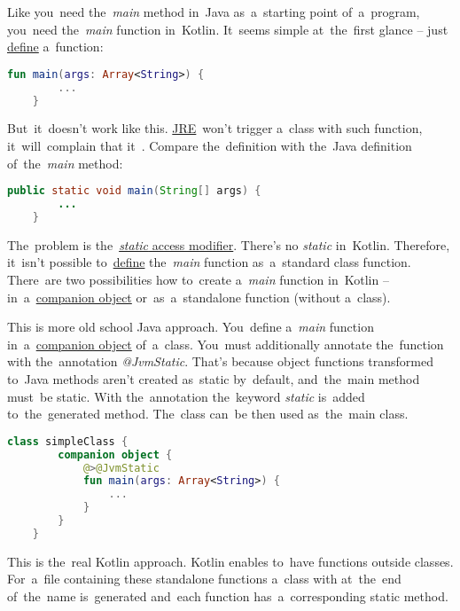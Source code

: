 Like you~need the~\textit{main} method in~Java as~a~starting point of~a~program, you~need the~\textit{main} function in~Kotlin.
It~seems simple at~the~first glance -- just \hyperref[declarationdefinition]{define} a~function:
\begin{lstlisting}[language=Kotlin]
    fun main(args: Array<String>) {
        ...
    }
\end{lstlisting}

\noindent But~it~doesn't work like this.
\hyperref[jdkjrejvm]{JRE}~won't trigger a~class with such function, it~will~complain that it~.
Compare the~definition with the~Java definition of~the~\textit{main} method:
\begin{lstlisting}[language=Java]
    public static void main(String[] args) {
        ...
    }
\end{lstlisting}

\noindent The~problem is the~\hyperref[javastatic]{\textit{static} access modifier}.
There's no \textit{static} in~Kotlin.
Therefore, it~isn't possible to~\hyperref[declarationdefinition]{define} the~\textit{main} function as~a~standard class function.
There~are two possibilities how to~create a~\textit{main} function in~Kotlin -- in~a~\hyperref[companionobject]{companion object} or~as~a~standalone function (without a~class).

This is more old school Java approach.
You~define a~\textit{main} function in~a~\hyperref[companionobject]{companion object} of~a~class.
You~must additionally annotate the~function with the~annotation \textit{@JvmStatic}.
That's because object functions transformed to~Java methods aren't created as~static by~default, and~the~main method must~be static.
With the~annotation the~keyword \textit{static} is~added to~the~generated method.
The~class can~be then used as~the~main class.

\begin{lstlisting}[language=Kotlin,title={Main function in~a~companion object}]
    class simpleClass {
        companion object {
            @>@JvmStatic
            fun main(args: Array<String>) {
                ...
            }
        }
    }
\end{lstlisting}

This is the~real Kotlin approach.
Kotlin enables to~have functions outside classes.
For~a~file containing these standalone functions a~class with  at~the~end of~the~name is~generated and~each function has~a~corresponding static method.

